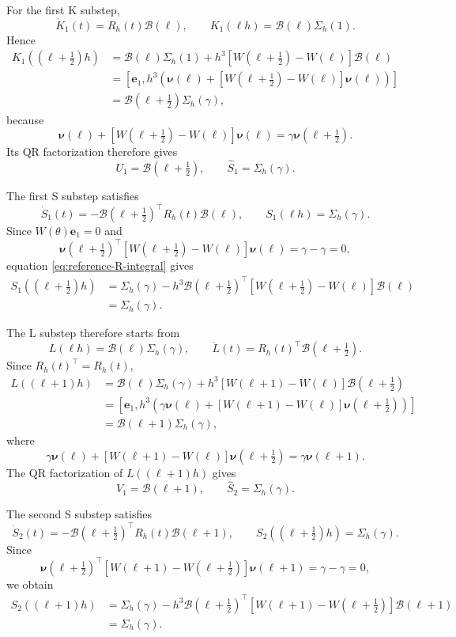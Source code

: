 \documentclass[]{article}
\numberwithin{equation}{section}
\theoremstyle{plain}
\theoremstyle{remark}
\begin{document}
For the first K substep,
\[
 \dot K_1(t)=R_h(t)\mathcal B(\ell),
 \qquad K_1(\ell h)=\mathcal B(\ell)\Sigma_h(1).
\]
Hence
\begin{align*}
 K_1((\ell+\tfrac12)h)
 &=\mathcal B(\ell)\Sigma_h(1)+h^3
 [W(\ell+\tfrac12)-W(\ell)]\mathcal B(\ell)\\
 &=\left[\boldsymbol e_1,
 h^3\left(\boldsymbol\nu(\ell)
 +[W(\ell+\tfrac12)-W(\ell)]\boldsymbol\nu(\ell)\right)\right]\\
 &=\mathcal B(\ell+\tfrac12)\Sigma_h(\gamma),
\end{align*}
because
\[
 \boldsymbol\nu(\ell)+
 [W(\ell+\tfrac12)-W(\ell)]\boldsymbol\nu(\ell)
 =\gamma\boldsymbol\nu(\ell+\tfrac12).
\]
Its QR factorization therefore gives
\[
 U_1=\mathcal B(\ell+\tfrac12),
 \qquad \widehat S_1=\Sigma_h(\gamma).
\]

The first S substep satisfies
\[
 \dot S_1(t)
 =-\mathcal B(\ell+\tfrac12)^\top R_h(t)\mathcal B(\ell),
 \qquad S_1(\ell h)=\Sigma_h(\gamma).
\]
Since $W(\theta)\boldsymbol e_1=0$ and
\[
 \boldsymbol\nu(\ell+\tfrac12)^\top
 [W(\ell+\tfrac12)-W(\ell)]\boldsymbol\nu(\ell)
 =\gamma-\gamma=0,
\]
equation \eqref{eq:reference-R-integral} gives
\begin{align*}
 S_1((\ell+\tfrac12)h)
 &=\Sigma_h(\gamma)-h^3\mathcal B(\ell+\tfrac12)^\top
 [W(\ell+\tfrac12)-W(\ell)]\mathcal B(\ell)\\
 &=\Sigma_h(\gamma).
\end{align*}

The L substep therefore starts from
\[
 L(\ell h)=\mathcal B(\ell)\Sigma_h(\gamma),
 \qquad \dot L(t)=R_h(t)^\top \mathcal B(\ell+\tfrac12).
\]
Since $R_h(t)^\top=R_h(t)$,
\begin{align*}
 L((\ell+1)h)
 &=\mathcal B(\ell)\Sigma_h(\gamma)+h^3
 [W(\ell+1)-W(\ell)]\mathcal B(\ell+\tfrac12)\\
 &=\left[\boldsymbol e_1,
 h^3\left(\gamma\boldsymbol\nu(\ell)
 +[W(\ell+1)-W(\ell)]\boldsymbol\nu(\ell+\tfrac12)\right)\right]\\
 &=\mathcal B(\ell+1)\Sigma_h(\gamma),
\end{align*}
where
\[
 \gamma\boldsymbol\nu(\ell)+
 [W(\ell+1)-W(\ell)]\boldsymbol\nu(\ell+\tfrac12)
 =\gamma\boldsymbol\nu(\ell+1).
\]
The QR factorization of $L((\ell+1)h)$ gives
\[
 V_1=\mathcal B(\ell+1),
 \qquad \widehat S_2=\Sigma_h(\gamma).
\]

The second S substep satisfies
\[
 \dot S_2(t)
 =-\mathcal B(\ell+\tfrac12)^\top R_h(t)\mathcal B(\ell+1),
 \qquad S_2((\ell+\tfrac12)h)=\Sigma_h(\gamma).
\]
Since
\[
 \boldsymbol\nu(\ell+\tfrac12)^\top
 [W(\ell+1)-W(\ell+\tfrac12)]\boldsymbol\nu(\ell+1)
 =\gamma-\gamma=0,
\]
we obtain
\begin{align*}
 S_2((\ell+1)h)
 &=\Sigma_h(\gamma)-h^3\mathcal B(\ell+\tfrac12)^\top
 [W(\ell+1)-W(\ell+\tfrac12)]\mathcal B(\ell+1)\\
 &=\Sigma_h(\gamma).
\end{align*}
\end{document}
